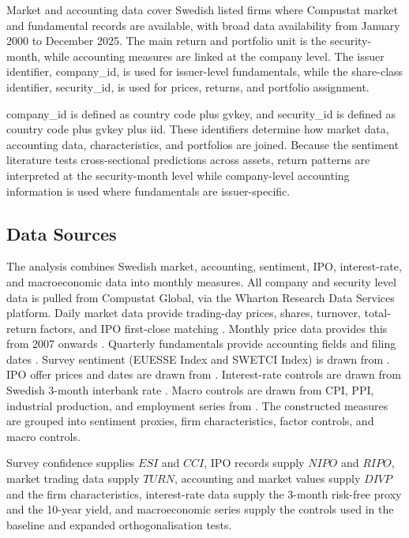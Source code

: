 \documentclass[11pt]{article}
\newcommand{\var}[1]{\ensuremath{#1}}
\newcommand{\repo}[1]{\textnormal{\small #1}}
\begin{document}
Market and accounting data cover Swedish listed firms where Compustat market and fundamental records are available, with broad data availability from January 2000 to December 2025. The main return and portfolio unit is the security-month, while accounting measures are linked at the company level. The issuer identifier, \repo{company\_id}, is used for issuer-level fundamentals, while the share-class identifier, \repo{security\_id}, is used for prices, returns, and portfolio assignment.

\repo{company\_id} is defined as country code plus \repo{gvkey}, and \repo{security\_id} is defined as country code plus \repo{gvkey} plus \repo{iid}. These identifiers determine how market data, accounting data, characteristics, and portfolios are joined. Because the sentiment literature tests cross-sectional predictions across assets, return patterns are interpreted at the security-month level while company-level accounting information is used where fundamentals are issuer-specific.

\subsection{Data Sources}
The analysis combines Swedish market, accounting, sentiment, IPO, interest-rate, and macroeconomic data into monthly measures. All company and security level data is pulled from Compustat Global, via the Wharton Research Data Services platform. Daily market data provide trading-day prices, shares, turnover, total-return factors, and IPO first-close matching \citep{wrdscompustatglobalsecuritydaily}. Monthly price data provides this from 2007 onwards \citep{wrdscompustatglobalsecuritymonthly}. Quarterly fundamentals provide accounting fields and filing dates \citep{wrdscompustatglobalfundamentalsquarterly}. Survey sentiment (EUESSE Index and SWETCI Index) is drawn from \citet{bloombergterminal}. IPO offer prices and dates are drawn from \citet{bloombergterminal}. Interest-rate controls are drawn from Swedish 3-month interbank rate \citep{fredswedeninterbank3m}. Macro controls are drawn from CPI, PPI, industrial production, and employment series from \citet{scbgeneralstatistics}. The constructed measures are grouped into sentiment proxies, firm characteristics, factor controls, and macro controls.

Survey confidence supplies \var{ESI} and \var{CCI}, IPO records supply \var{NIPO} and \var{RIPO}, market trading data supply \var{TURN}, accounting and market values supply \var{DIVP} and the firm characteristics, interest-rate data supply the 3-month risk-free proxy and the 10-year yield, and macroeconomic series supply the controls used in the baseline and expanded orthogonalisation tests.
\end{document}
